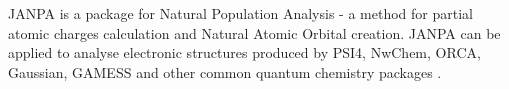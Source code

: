 JANPA is a package for Natural Population Analysis - a method for partial atomic charges calculation and Natural Atomic Orbital creation. JANPA can be applied to analyse electronic structures produced by PSI4, NwChem, ORCA, Gaussian, GAMESS and other common quantum chemistry packages \cite{Nikolaienko_2014}.